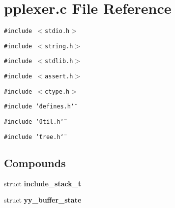 \section{pplexer.c File Reference}
\label{pplexer_8c}
{\tt \#include $<$stdio.h$>$}\par
{\tt \#include $<$string.h$>$}\par
{\tt \#include $<$stdlib.h$>$}\par
{\tt \#include $<$assert.h$>$}\par
{\tt \#include $<$ctype.h$>$}\par
{\tt \#include \char`\"{}defines.h\char`\"{}}\par
{\tt \#include \char`\"{}util.h\char`\"{}}\par
{\tt \#include \char`\"{}tree.h\char`\"{}}\par
\subsection*{Compounds}
\begin{CompactItemize}
\item 
struct {\bf include\_\-stack\_\-t}
\item 
struct {\bf yy\_\-buffer\_\-state}
\end{CompactItemize}
